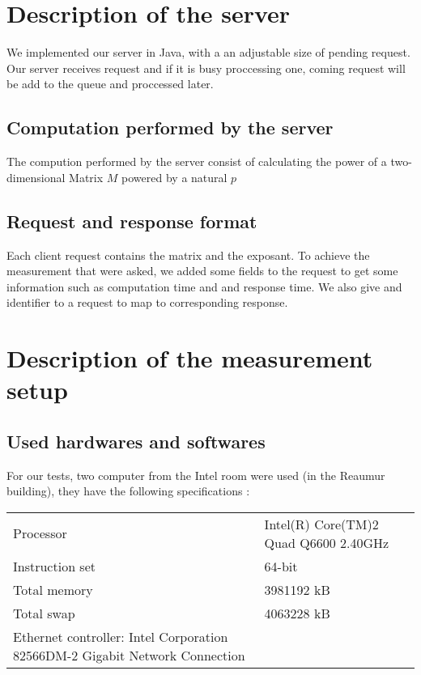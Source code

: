 \section{Description of the server}
\label{sec:Description of the server}
We implemented our server in Java, with a an adjustable size
of pending request. Our server receives request and if it is busy proccessing one,
coming request will be add to the queue and proccessed later.

\subsection{Computation performed by the server}
\label{sub:Computation performed by the server}
The compution performed by the server consist of calculating the power of a
two-dimensional Matrix $M$ powered by a natural $p$
\subsection{Request and response format}
Each client request contains the matrix and the exposant. To achieve the
measurement that were asked, we added some fields to the request to get
some information such as computation time and and response time. We also
give and identifier to a request to map to corresponding response.
\label{sub:Request and response format}

\section{Description of the measurement setup}
\label{sec:Description of the measurement setup}

\subsection{Used hardwares and softwares}
\label{sub:Used hardwares and softwares}

For our tests, two computer from the Intel room were used (in the Reaumur
building), they have the following specifications :

\begin{tabular}{|l|l|}
    \hline
    Processor & Intel(R) Core(TM)2 Quad Q6600 \@ 2.40GHz \\
    Instruction set & 64-bit \\
    \hline
    Total memory & 3981192 kB \\
    Total swap & 4063228 kB \\
    \hline
    Ethernet controller: Intel Corporation 82566DM-2 Gigabit Network Connection
    \hline
\end{tabular}
\bigskip

